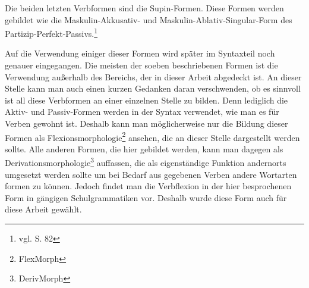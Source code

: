 Die beiden letzten Verbformen sind die Supin-Formen. Diese Formen werden gebildet wie die Maskulin-Akkusativ- und Maskulin-Ablativ-Singular-Form des Partizip-Perfekt-Passivs.\footnote{vgl. \cite{BAYER-LINDAUER1994} S. 82} \par
Auf die Verwendung einiger dieser Formen wird später im Syntaxteil noch genauer eingegangen. Die meisten der soeben beschriebenen Formen ist die Verwendung außerhalb des Bereichs, der in dieser Arbeit abgedeckt ist. An dieser Stelle kann man auch einen kurzen Gedanken daran verschwenden, ob es sinnvoll ist all diese Verbformen an einer einzelnen Stelle zu bilden. Denn lediglich die Aktiv- und Passiv-Formen werden in der Syntax verwendet, wie man es für Verben gewohnt ist. Deshalb kann man möglicherweise nur die Bildung dieser Formen als Flexionsmorphologie\footnote{FlexMorph} ansehen, die an dieser Stelle dargestellt werden sollte. Alle anderen Formen, die hier gebildet werden, kann man dagegen als Derivationsmorphologie\footnote{DerivMorph} auffassen, die als eigenständige Funktion andernorts umgesetzt werden sollte um bei Bedarf aus gegebenen Verben andere Wortarten formen zu können. Jedoch findet man die Verbflexion in der hier besprochenen Form in gängigen Schulgrammatiken vor. Deshalb wurde diese Form auch für diese Arbeit gewählt. %
